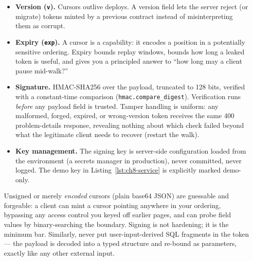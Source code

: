 \begin{itemize}
  \item \textbf{Version (\texttt{v}).} Cursors outlive deploys. A version
        field lets the server reject (or migrate) tokens minted by a previous
        contract instead of misinterpreting them as corrupt.
  \item \textbf{Expiry (\texttt{exp}).} A cursor is a capability: it encodes
        a position in a potentially sensitive ordering. Expiry bounds replay
        windows, bounds how long a leaked token is useful, and gives you a
        principled answer to ``how long may a client pause mid-walk?''
  \item \textbf{Signature.} HMAC-SHA256 over the payload, truncated to 128
        bits, verified with a constant-time comparison
        (\texttt{hmac.compare\_digest}). Verification runs \emph{before} any
        payload field is trusted. Tamper handling is uniform: any malformed,
        forged, expired, or wrong-version token receives the same 400
        problem-details response, revealing nothing about which check failed
        beyond what the legitimate client needs to recover (restart the
        walk).
  \item \textbf{Key management.} The signing key is server-side
        configuration loaded from the environment (a secrets manager in
        production), never committed, never logged. The demo key in
        Listing~\ref{lst:ch8-service} is explicitly marked demo-only.
\end{itemize}

\begin{warningbox}
Unsigned or merely \emph{encoded} cursors (plain base64 JSON) are guessable
and forgeable: a client can mint a cursor pointing anywhere in your
ordering, bypassing any access control you keyed off earlier pages, and can
probe field values by binary-searching the boundary. Signing is not
hardening; it is the minimum bar. Similarly, never put user-input-derived
SQL fragments in the token --- the payload is decoded into a typed
structure and re-bound as parameters, exactly like any other external input.
\end{warningbox}


